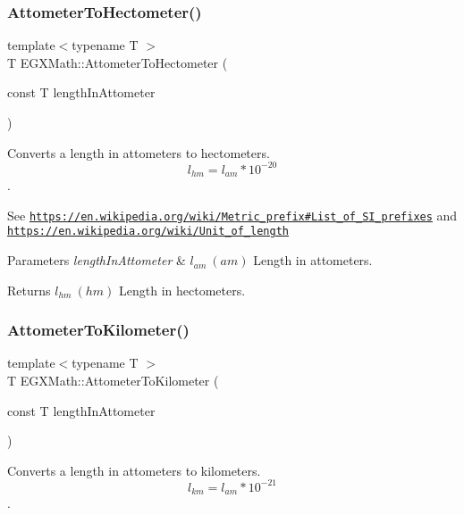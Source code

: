 \subsubsection{\texorpdfstring{Attometer\+To\+Hectometer()}{AttometerToHectometer()}}
{\footnotesize\ttfamily template$<$typename T $>$ \\
T E\+G\+X\+Math\+::\+Attometer\+To\+Hectometer (\begin{DoxyParamCaption}\item[{const T}]{length\+In\+Attometer }\end{DoxyParamCaption})}



Converts a length in attometers to hectometers. \[ l_{hm}=l_{am} * 10^{-20} \]. 

See \href{https://en.wikipedia.org/wiki/Metric_prefix#List_of_SI_prefixes}{\tt https\+://en.\+wikipedia.\+org/wiki/\+Metric\+\_\+prefix\#\+List\+\_\+of\+\_\+\+S\+I\+\_\+prefixes} and \href{https://en.wikipedia.org/wiki/Unit_of_length}{\tt https\+://en.\+wikipedia.\+org/wiki/\+Unit\+\_\+of\+\_\+length} 
\begin{DoxyParams}{Parameters}
{\em length\+In\+Attometer} & $ l_{am}\ (am)$ Length in attometers. \\
\hline
\end{DoxyParams}
\begin{DoxyReturn}{Returns}
$ l_{hm}\ (hm)$ Length in hectometers. 
\end{DoxyReturn}
\mbox{\label{group___e_g_x_math-_conversions-_length_conversions-_attometer-_s_i_gafc247d0f5b16a1e83c2f210812ee41e8}} 
\subsubsection{\texorpdfstring{Attometer\+To\+Kilometer()}{AttometerToKilometer()}}
{\footnotesize\ttfamily template$<$typename T $>$ \\
T E\+G\+X\+Math\+::\+Attometer\+To\+Kilometer (\begin{DoxyParamCaption}\item[{const T}]{length\+In\+Attometer }\end{DoxyParamCaption})}



Converts a length in attometers to kilometers. \[ l_{km}=l_{am} * 10^{-21} \]. 

